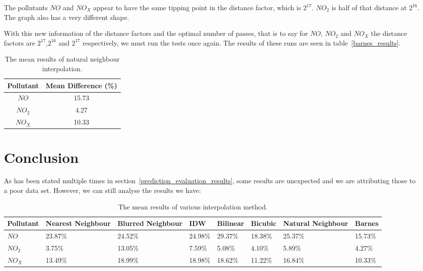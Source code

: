         	The pollutants $NO$ and $NO_{X}$ appear to have the same tipping point in the distance factor, which is $2^{17}$. $NO_{2}$ is half of that distance at $2^{16}$. The graph also has a very different shape. 

        	With this new information of the distance factors and the optimal number of passes, that is to say for $NO$, $NO_{2}$ and $NO_{X}$ the distance factors are $2^{17}$,$2^{16}$ and $2^{17}$ respectively, we must run the tests once again. The results of these runs are seen in table~\ref{barnes_results}.

        	\begin{table}[H]
				\centering
	    		\begin{tabular}{|c|c|}
	    			\hline
					Pollutant & Mean Difference (\%) \\ \hline
					$NO$ & 15.73 \\
					$NO_{2}$ & 4.27 \\
					$NO_{X}$ & 10.33 \\
					\hline
				\end{tabular}
				\caption{The mean results of natural neighbour interpolation.}
				\label{tab:barnes_results}
			\end{table} 

	\section{Conclusion}


		As has been stated multiple times in section~\ref{prediction_evaluation_results}, some results are unexpected and we are attributing those to a poor data set. However, we can still analyse the results we have:

		\begin{table}[H]
			\centering
    		\begin{tabularx}{\linewidth}{|X|X|X|X|X|X|X|X|}
    			\hline
				Pollutant & Nearest Neighbour & Blurred Neighbour & IDW & Bilinear & Bicubic & Natural Neighbour & Barnes \\ \hline
				$NO$ & 23.87\% & 24.52\% & 24.98\% & 29.37\% & 18.38\% & 25.37\% & 15.73\% \\
				$NO_{2}$ & 3.75\% & 13.05\% & 7.59\% & 5.08\% & 4.10\% & 5.89\% & 4.27\% \\
				$NO_{X}$ & 13.49\% & 18.99\% & 18.98\% & 18.62\% & 11.22\% & 16.84\% & 10.33\% \\
				\hline
			\end{tabularx}
			\caption{The mean results of various interpolation method.}
			\label{tab:all_results}
		\end{table}

